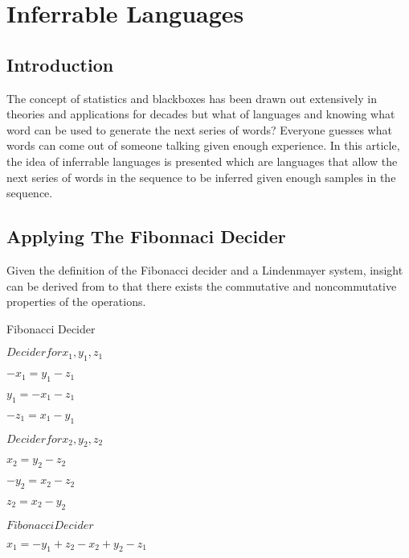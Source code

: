 
\chapter{Inferrable Languages} %

\label{ChapterX} %


\section{Introduction}

The concept of statistics and blackboxes has been drawn out extensively in theories and applications for decades but what of languages and knowing what word can be used to generate the next series of words? Everyone guesses what words can come out of someone talking given enough experience. In this article, the idea of inferrable languages is presented which are languages that allow the next series of words in the sequence to be inferred given enough samples in the sequence.


\section{Applying The Fibonnaci Decider}

Given the definition of the Fibonacci decider and a Lindenmayer system, insight can be derived from to that there exists the commutative and noncommutative properties of the operations.

Fibonacci Decider

$Decider for {x_1, y_1, z_1}$

$-x_1 = y_1 - z_1$

$y_1 = -x_1 - z_1$

$-z_1 = x_1 - y_1$

$Decider for {x_2, y_2, z_2}$

$x_2 = y_2 - z_2$

$-y_2 = x_2 - z_2$

$z_2 = x_2 - y_2$

$Fibonacci Decider$

$x_1 = -y_1 +z_2 - x_2 + y_2 - z_1$

